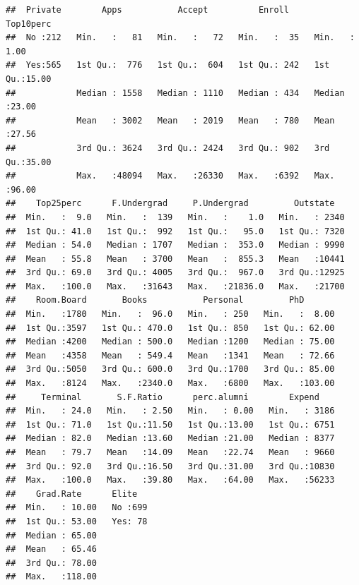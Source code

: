 \documentclass[]{article}
\newenvironment{Shaded}{\begin{snugshade}}{\end{snugshade}}
\newcommand{\KeywordTok}[1]{\textcolor[rgb]{0.13,0.29,0.53}{\textbf{#1}}}
\newcommand{\OperatorTok}[1]{\textcolor[rgb]{0.81,0.36,0.00}{\textbf{#1}}}
\newcommand{\NormalTok}[1]{#1}
\begin{document}
\begin{verbatim}
##  Private        Apps           Accept          Enroll       Top10perc    
##  No :212   Min.   :   81   Min.   :   72   Min.   :  35   Min.   : 1.00  
##  Yes:565   1st Qu.:  776   1st Qu.:  604   1st Qu.: 242   1st Qu.:15.00  
##            Median : 1558   Median : 1110   Median : 434   Median :23.00  
##            Mean   : 3002   Mean   : 2019   Mean   : 780   Mean   :27.56  
##            3rd Qu.: 3624   3rd Qu.: 2424   3rd Qu.: 902   3rd Qu.:35.00  
##            Max.   :48094   Max.   :26330   Max.   :6392   Max.   :96.00  
##    Top25perc      F.Undergrad     P.Undergrad         Outstate    
##  Min.   :  9.0   Min.   :  139   Min.   :    1.0   Min.   : 2340  
##  1st Qu.: 41.0   1st Qu.:  992   1st Qu.:   95.0   1st Qu.: 7320  
##  Median : 54.0   Median : 1707   Median :  353.0   Median : 9990  
##  Mean   : 55.8   Mean   : 3700   Mean   :  855.3   Mean   :10441  
##  3rd Qu.: 69.0   3rd Qu.: 4005   3rd Qu.:  967.0   3rd Qu.:12925  
##  Max.   :100.0   Max.   :31643   Max.   :21836.0   Max.   :21700  
##    Room.Board       Books           Personal         PhD        
##  Min.   :1780   Min.   :  96.0   Min.   : 250   Min.   :  8.00  
##  1st Qu.:3597   1st Qu.: 470.0   1st Qu.: 850   1st Qu.: 62.00  
##  Median :4200   Median : 500.0   Median :1200   Median : 75.00  
##  Mean   :4358   Mean   : 549.4   Mean   :1341   Mean   : 72.66  
##  3rd Qu.:5050   3rd Qu.: 600.0   3rd Qu.:1700   3rd Qu.: 85.00  
##  Max.   :8124   Max.   :2340.0   Max.   :6800   Max.   :103.00  
##     Terminal       S.F.Ratio      perc.alumni        Expend     
##  Min.   : 24.0   Min.   : 2.50   Min.   : 0.00   Min.   : 3186  
##  1st Qu.: 71.0   1st Qu.:11.50   1st Qu.:13.00   1st Qu.: 6751  
##  Median : 82.0   Median :13.60   Median :21.00   Median : 8377  
##  Mean   : 79.7   Mean   :14.09   Mean   :22.74   Mean   : 9660  
##  3rd Qu.: 92.0   3rd Qu.:16.50   3rd Qu.:31.00   3rd Qu.:10830  
##  Max.   :100.0   Max.   :39.80   Max.   :64.00   Max.   :56233  
##    Grad.Rate      Elite    
##  Min.   : 10.00   No :699  
##  1st Qu.: 53.00   Yes: 78  
##  Median : 65.00            
##  Mean   : 65.46            
##  3rd Qu.: 78.00            
##  Max.   :118.00
\end{verbatim}

\begin{Shaded}
\end{Shaded}
\end{document}
